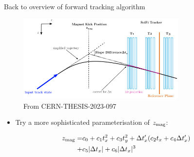 \documentclass[xcolor={dvipsnames}]{beamer}
\begin{document}
\begin{frame}{Back to overview of forward tracking algorithm}
  \vspace{0.0cm}
  \begin{figure}[htb]
    \centering
    \includegraphics[width=0.75\textwidth]{Plots/MagnetKinkPosition.png}
    \caption*{\small From CERN-THESIS-2023-097}
  \end{figure}
  \vspace{-0.3cm}
  \begin{itemize}
    \item{Try a more sophisticated parameterisation of $z_{\rm mag}$:}
  \end{itemize}
  \vspace{-0.2cm}
  \begin{align*}
    z_{\rm mag} =& c_0 + c_1t_x^2 + c_3t_y^2 + \Delta t_x^\prime(c_2t_x + c_4\Delta t_x^\prime) \\
    +& c_5\lvert\Delta t_x\rvert + c_6\lvert\Delta t_x\rvert^3
  \end{align*}
\end{frame}
\end{document}
